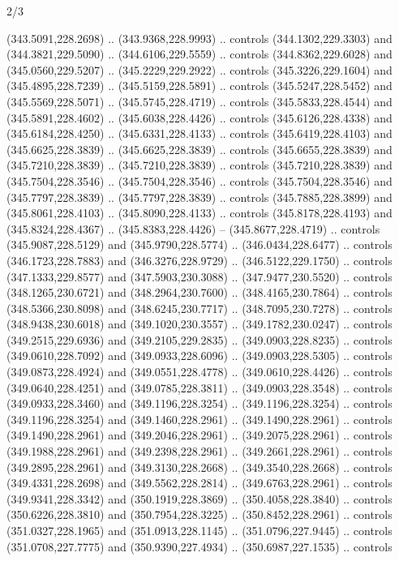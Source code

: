\begin{flagdescription}{2/3}
\begin{scope}[xshift=0.5\flaglength,yshift=0.5\flagwidth,scale=\flagwidth/495.65]
\begin{scope}[y=0.8pt, x=0.8pt, yscale=-1,shift={(-463.76,-309.78)}]
  (343.5091,228.2698) .. (343.9368,228.9993) .. controls (344.1302,229.3303) and
  (344.3821,229.5090) .. (344.6106,229.5559) .. controls (344.8362,229.6028) and
  (345.0560,229.5207) .. (345.2229,229.2922) .. controls (345.3226,229.1604) and
  (345.4895,228.7239) .. (345.5159,228.5891) .. controls (345.5247,228.5452) and
  (345.5569,228.5071) .. (345.5745,228.4719) .. controls (345.5833,228.4544) and
  (345.5891,228.4602) .. (345.6038,228.4426) .. controls (345.6126,228.4338) and
  (345.6184,228.4250) .. (345.6331,228.4133) .. controls (345.6419,228.4103) and
  (345.6625,228.3839) .. (345.6625,228.3839) .. controls (345.6655,228.3839) and
  (345.7210,228.3839) .. (345.7210,228.3839) .. controls (345.7210,228.3839) and
  (345.7504,228.3546) .. (345.7504,228.3546) .. controls (345.7504,228.3546) and
  (345.7797,228.3839) .. (345.7797,228.3839) .. controls (345.7885,228.3899) and
  (345.8061,228.4103) .. (345.8090,228.4133) .. controls (345.8178,228.4193) and
  (345.8324,228.4367) .. (345.8383,228.4426) -- (345.8677,228.4719) .. controls
  (345.9087,228.5129) and (345.9790,228.5774) .. (346.0434,228.6477) .. controls
  (346.1723,228.7883) and (346.3276,228.9729) .. (346.5122,229.1750) .. controls
  (347.1333,229.8577) and (347.5903,230.3088) .. (347.9477,230.5520) .. controls
  (348.1265,230.6721) and (348.2964,230.7600) .. (348.4165,230.7864) .. controls
  (348.5366,230.8098) and (348.6245,230.7717) .. (348.7095,230.7278) .. controls
  (348.9438,230.6018) and (349.1020,230.3557) .. (349.1782,230.0247) .. controls
  (349.2515,229.6936) and (349.2105,229.2835) .. (349.0903,228.8235) .. controls
  (349.0610,228.7092) and (349.0933,228.6096) .. (349.0903,228.5305) .. controls
  (349.0873,228.4924) and (349.0551,228.4778) .. (349.0610,228.4426) .. controls
  (349.0640,228.4251) and (349.0785,228.3811) .. (349.0903,228.3548) .. controls
  (349.0933,228.3460) and (349.1196,228.3254) .. (349.1196,228.3254) .. controls
  (349.1196,228.3254) and (349.1460,228.2961) .. (349.1490,228.2961) .. controls
  (349.1490,228.2961) and (349.2046,228.2961) .. (349.2075,228.2961) .. controls
  (349.1988,228.2961) and (349.2398,228.2961) .. (349.2661,228.2961) .. controls
  (349.2895,228.2961) and (349.3130,228.2668) .. (349.3540,228.2668) .. controls
  (349.4331,228.2698) and (349.5562,228.2814) .. (349.6763,228.2961) .. controls
  (349.9341,228.3342) and (350.1919,228.3869) .. (350.4058,228.3840) .. controls
  (350.6226,228.3810) and (350.7954,228.3225) .. (350.8452,228.2961) .. controls
  (351.0327,228.1965) and (351.0913,228.1145) .. (351.0796,227.9445) .. controls
  (351.0708,227.7775) and (350.9390,227.4934) .. (350.6987,227.1535) .. controls

\end{scope}
\end{scope}
\end{flagdescription}
